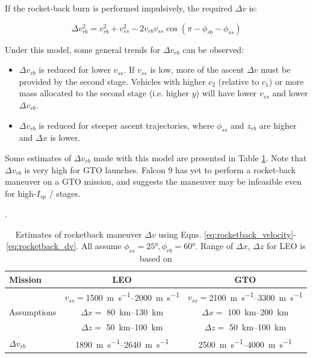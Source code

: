 \documentclass[conf]{new-aiaa}
\begin{document}
If the rocket-back burn is performed impulsively, the required $\Delta v$ is:

\begin{equation}
\label{eq:rocketback_dv}
\Delta v_{rb}^2 = v_{rb}^2 + v_{ss}^2 - 2 v_{rb} v_{ss} \cos(\pi - \phi_{rb} - \phi_{ss})
\end{equation}

Under this model, some general trends for $\Delta v_{rb}$ can be observed:
\begin{itemize}
	\item $\Delta v_{rb}$ is reduced for lower $v_{ss}$. If $v_{ss}$ is low, more of the ascent $\Delta v$ must be provided by the second stage. Vehicles with higher $c_2$ (relative to $c_1$) or more mass allocated to the second stage (i.e. higher $y$) will have lower $v_{ss}$ and lower $\Delta v_{rb}$.
	\item $\Delta v_{rb}$ is reduced for steeper ascent trajectories, where $\phi_{ss}$ and $z_{rb}$ are higher and $\Delta x$ is lower.
\end{itemize}

Some estimates of $\Delta v_{rb}$ made with this model are presented in Table \ref{tab:rocketback}. Note that $\Delta v_{rb}$ is very high for GTO launches. Falcon 9 has yet to perform a rocket-back maneuver on a GTO mission, and \cite{Dumont2017} suggests the maneuver may be infeasible even for high-$I_{sp}$ / stages.

\begin{table}
	\caption{\label{tab:rocketback} Estimates of rocketback maneuver $\Delta v$ using Eqns. \ref{eq:rocketback_velocity}-\ref{eq:rocketback_dv}. All assume $\phi_{ss}=\ang{25}, \phi_{rb}=\ang{60}$. Range of $\Delta x$, $\Delta z$ for LEO is based on \cite{McKinney1986}}.
	\centering
	\begin{tabular}{l c c}
		Mission & LEO & GTO \\
		\hline
		& $v_{ss} = $\SIrange{1500}{2000}{\meter\per\second} & $v_{ss} = $\SIrange{2100}{3300}{\meter\per\second} \\
		Assumptions & $\Delta x = $ \SIrange{80}{130}{\kilo\meter} & $\Delta x = $ \SIrange{100}{200}{\kilo\meter} \\
		& $\Delta z = $ \SIrange{50}{100}{\kilo\meter} & $\Delta z = $ \SIrange{50}{100}{\kilo\meter} \\
		\hline
		$\Delta v_{rb}$ & \SIrange{1890}{2640}{\meter\per\second} & \SIrange{2500}{4000}{\meter\per\second}
		
	\end{tabular}
\end{table}
\end{document}
